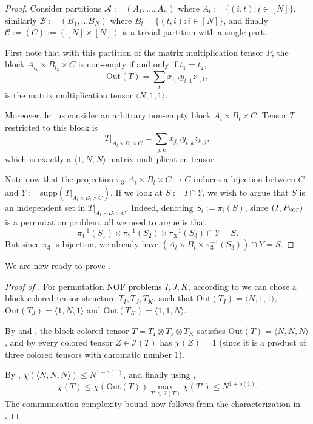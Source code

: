 \documentclass[10pt,a4paper]{article}
\newcommand{\cI}{\mathcal{I}}
\newcommand{\Inn}{\cI}
\newcommand{\supp}{\mathrm{supp}}
\newcommand{\Out}{\mathrm{Out}}
\newcommand{\mmP}{P_{\textsc{nof}}}
\newcommand{\inprod}[1]{\langle #1 \rangle}
\begin{document}
\begin{proof}
    Consider partitions $\mathcal{A} := (A_1, \ldots, A_n)$ where $A_t := \{ (i, t) : i \in [N] \}$, similarly $\mathcal{B} := (B_1, \ldots B_N)$ where $B_t = \{ (t, i) : i \in [N] \}$, and finally $\mathcal{C} := (C) := ([N] \times [N])$ is a trivial partition with a single part.

    First note that with this partition of the matrix multiplication tensor $P$, the block $A_{t_1} \times B_{t_2} \times C$ is non-empty if and only if $t_1 = t_2$,
    \begin{equation*}
        \Out(T) = \sum_{t} x_{1,t} y_{t, 1} z_{1,1},
    \end{equation*}
    is the matrix multiplication tensor $\inprod{N,1,1}$.

    Moreover, let us consider an arbitrary non-empty block $A_t \times B_t \times C$. Tensor $T$ restricted to this block is
    \begin{equation*}
        T|_{A_t \times B_t \times C} = \sum_{j,k} x_{j,t} y_{t, k} z_{k,j},
    \end{equation*}
    which is exactly a $\inprod{1,N,N}$ matrix multiplication tensor.

    Note now that the projection $\pi_3 : A_t \times B_t \times C \to C$ induces a bijection between $C$ and $Y := \supp(T|_{A_t \times B_t \times C})$. If we look at $S := I \cap Y$, we wish to argue that $S$ is an independent set in $T|_{A_t \times B_t \times C}$. Indeed, denoting $S_i := \pi_i(S)$, since $(I, \mmP)$ is a permutation problem, all we need to argue is that 
    \begin{equation*}
        \pi_1^{-1}(S_1) \times \pi_2^{-1}(S_2) \times \pi_3^{-1}(S_3) \cap Y = S.
    \end{equation*}
    But since $\pi_3$ is bijection, we already have $(A_t \times B_t \times \pi_3^{-1}(S_3)) \cap Y = S$.
\end{proof}

We are now ready to prove .
\begin{proof}[Proof of ]
For permutation NOF problems $I, J, K$, according to  we can chose a block-colored tensor structure $T_I, T_J, T_K$, such that $\Out(T_I) = \inprod{N,1,1}$, $\Out(T_J) = \inprod{1,N,1}$ and $\Out(T_K) = \inprod{1,1,N}$.

By  and , the block-colored tensor $T = T_I \otimes T_J \otimes T_K$ satisfies $\Out(T) = \inprod{N,N,N}$, and by  every colored tensor $Z \in \Inn(T)$ has $\chi(Z) = 1$ (since it is a product of three colored tensors with chromatic number $1$).

By , $\chi(\inprod{N,N,N}) \leq N^{1 + o(1)}$, and finally using , 
\begin{equation*}
    \chi(T) \leq \chi(\Out(T)) \max_{T' \in \Inn(T)} \chi(T') \leq N^{1+o(1)}.
\end{equation*}
The communication complexity bound now follows from the characterization in .
\end{proof}
\end{document}
